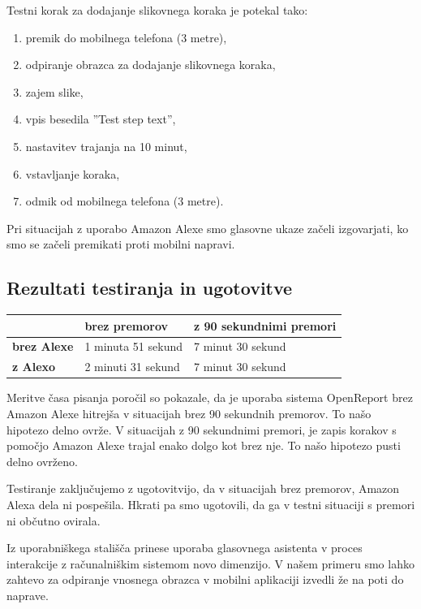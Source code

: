 \documentclass[a4paper, 12pt]{book}
\begin{document}
\noindent Testni korak za dodajanje slikovnega koraka je potekal tako:
\begin{enumerate}
	\item premik do mobilnega telefona (3 metre),
	\item odpiranje obrazca za dodajanje slikovnega koraka,
	\item zajem slike,
	\item vpis besedila ''Test step text'',
	\item nastavitev trajanja na 10 minut,
	\item vstavljanje koraka,
	\item odmik od mobilnega telefona (3 metre).
\end{enumerate}

Pri situacijah z uporabo Amazon Alexe smo glasovne ukaze začeli izgovarjati, ko smo se začeli premikati proti mobilni napravi.

\subsection{Rezultati testiranja in ugotovitve}

\noindent\begin{tabular}{p{}|p{}|p{}}    
  {\bf } & {\bf brez premorov}                             & {\bf z 90 sekundnimi premori} \\ \hline
  {\bf brez Alexe} & 1 minuta 51 sekund & 7 minut 30 sekund \\
  {\bf z Alexo} & 2 minuti 31 sekund & 7 minut 30 sekund \\
\end{tabular}

\bigbreak
\bigbreak

Meritve časa pisanja poročil so pokazale, da je uporaba sistema OpenReport brez Amazon Alexe hitrejša v situacijah brez 90 sekundnih premorov.
To našo hipotezo delno ovrže.
V situacijah z 90 sekundnimi premori, je zapis korakov s pomočjo Amazon Alexe trajal enako dolgo kot brez nje.
To našo hipotezo pusti delno ovrženo.

Testiranje zaključujemo z ugotovitvijo, da v situacijah brez premorov, Amazon Alexa dela ni pospešila.
Hkrati pa smo ugotovili, da ga v testni situaciji s premori ni občutno ovirala.

Iz uporabniškega stališča prinese uporaba glasovnega asistenta v proces interakcije z računalniškim sistemom novo dimenzijo.
V našem primeru smo lahko zahtevo za odpiranje vnosnega obrazca v mobilni aplikaciji izvedli že na poti do naprave.
\end{document}

